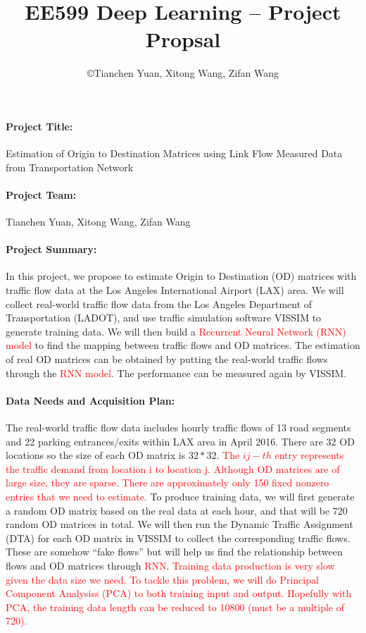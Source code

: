 \documentclass[11pt]{article}
\title{\bf EE599 Deep Learning -- Project Propsal}
\author{\copyright  Tianchen Yuan, Xitong Wang, Zifan Wang}
\begin{document}
\maketitle

\paragraph{Project Title:}  Estimation of Origin to Destination Matrices using Link Flow Measured Data from Transportation Network

\paragraph{Project Team:} Tianchen Yuan, Xitong Wang, Zifan Wang 

\paragraph{Project Summary:} In this project, we propose to estimate Origin to Destination (OD) matrices with traffic flow data at the Los Angeles International Airport (LAX) area. We will collect real-world traffic flow data from the Los Angeles Department of Transportation (LADOT), and use traffic simulation software VISSIM to generate training data. We will then build a \textcolor{red}{Recurrent Neural Network (RNN) model} to find the mapping between traffic flows and OD matrices. The estimation of real OD matrices can be obtained by putting the real-world traffic flows through the \textcolor{red}{RNN model}. The performance can be measured again by VISSIM.  

\paragraph{Data Needs and Acquisition Plan:} The real-world traffic flow data includes hourly traffic flows of 13 road segments and 22 parking entrances/exits within LAX area in April 2016. There are 32 OD locations so the size of each OD matrix is $32*32$. \textcolor{red}{The $ij-th$ entry represents the traffic demand from location i to location j. Although OD matrices are of large size, they are sparse. There are approximately only 150 fixed nonzero entries that we need to estimate.} To produce training data, we will first generate a random OD matrix based on the real data at each hour, and that will be 720 random OD matrices in total. We will then run the Dynamic Traffic Assignment (DTA) for each OD matrix in VISSIM to collect the corresponding traffic flows. These are somehow “fake flows” but will help us find the relationship between flows and OD matrices through \textcolor{red}{RNN}. \textcolor{red}{Training data production is very slow given the data size we need. To tackle this problem, we will do Principal Component Analysiss (PCA) to both training input and output. Hopefully with PCA, the training data length can be reduced to 10800 (must be a multiple of 720).} 
\end{document}
